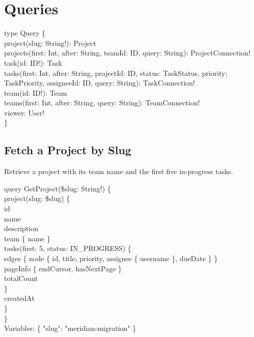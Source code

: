 \section*{Queries}

\begin{schemabox}[title=Root Query Fields]
type Query \{\\
\quad project(slug: String!): Project\\
\quad projects(first: Int, after: String, teamId: ID, query: String): ProjectConnection!\\
\quad task(id: ID!): Task\\
\quad tasks(first: Int, after: String, projectId: ID, status: TaskStatus, priority: TaskPriority, assigneeId: ID, query: String): TaskConnection!\\
\quad team(id: ID!): Team\\
\quad teams(first: Int, after: String, query: String): TeamConnection!\\
\quad viewer: User!\\
\}
\end{schemabox}

\subsection*{Fetch a Project by Slug}

Retrieve a project with its team name and the first five in-progress tasks.

\vspace{2pt}
\begin{querybox}[title=Query: Get Project]
query GetProject(\$slug: String!) \{\\
\quad project(slug: \$slug) \{\\
\qquad id\\
\qquad name\\
\qquad description\\
\qquad team \{ name \}\\
\qquad tasks(first: 5, status: IN\_PROGRESS) \{\\
\qquad\quad edges \{ node \{ id, title, priority, assignee \{ username \}, dueDate \} \}\\
\qquad\quad pageInfo \{ endCursor, hasNextPage \}\\
\qquad\quad totalCount\\
\qquad \}\\
\qquad createdAt\\
\quad \}\\
\}\\[2pt]
Variables: \{ "slug": "meridian-migration" \}
\end{querybox}

